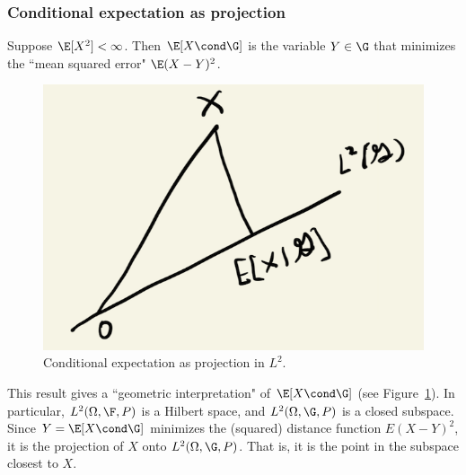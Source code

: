 \documentclass{article} %
\begin{document}
\subsubsection{Conditional expectation as projection}

\begin{theorem}
\cite[Thm.~5.1.8]{durrett2010probability} Suppose $\E[X^2] < \infty$. Then $\E[X \cond \G]$ is the variable $Y \in \G$ that minimizes the ``mean squared error" $\E(X - Y)^2$. 
\label{thm:conditional_expectation_minimizes_the_mean_squard_error}	
\end{theorem}

\begin{figure}[H]
\centering
\includegraphics[width=.5\textwidth]{images/conditional_expectation_as_projection}
\caption{Conditional expectation as projection in $L^2$.}
\label{fig:conditional_expectation_as_projection}
\end{figure}

\begin{remark}
\cite[pp.229]{durrett2010probability} This result gives a ``geometric interpretation" of $\E[X \cond \G]$ (see Figure~\ref{fig:conditional_expectation_as_projection}).  In particular, $L^2(\Omega, \F, P)$ is a Hilbert space, and $L^2(\Omega, \G, P)$ is a closed subspace.  Since $Y=\E[X \cond \G]$ minimizes the (squared) distance function $E(X-Y)^2$, it is the projection of $X$ onto $L^2(\Omega, \G, P)$. That is, it is the point in the subspace closest to $X$. 
\end{remark}
\end{document}
